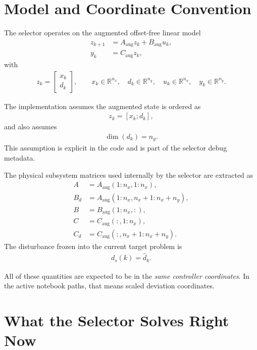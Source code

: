 \documentclass[11pt]{article}
\begin{document}
\section{Model and Coordinate Convention}
The selector operates on the augmented offset-free linear model
\begin{align}
z_{k+1} &= A_{\mathrm{aug}} z_k + B_{\mathrm{aug}} u_k, \\
y_k &= C_{\mathrm{aug}} z_k,
\end{align}
with
\begin{align}
z_k = \begin{bmatrix} x_k \\ d_k \end{bmatrix},
\qquad
x_k \in \mathbb{R}^{n_x},
\quad
d_k \in \mathbb{R}^{n_y},
\quad
u_k \in \mathbb{R}^{n_u},
\quad
y_k \in \mathbb{R}^{n_y}.
\end{align}

The implementation assumes the augmented state is ordered as
\begin{align}
z_k = [x_k;d_k],
\end{align}
and also assumes
\begin{align}
\dim(d_k) = n_y.
\end{align}
This assumption is explicit in the code and is part of the selector debug metadata.

The physical subsystem matrices used internally by the selector are extracted as
\begin{align}
A &= A_{\mathrm{aug}}(1\!:\!n_x,1\!:\!n_x), \\
B_d &= A_{\mathrm{aug}}(1\!:\!n_x,n_x\!+\!1\!:\!n_x\!+\!n_y), \\
B &= B_{\mathrm{aug}}(1\!:\!n_x,:), \\
C &= C_{\mathrm{aug}}(:,1\!:\!n_x), \\
C_d &= C_{\mathrm{aug}}(:,n_x\!+\!1\!:\!n_x\!+\!n_y).
\end{align}
The disturbance frozen into the current target problem is
\begin{align}
d_s(k) = \hat d_k.
\end{align}

All of these quantities are expected to be in the \emph{same controller coordinates}. In the active notebook paths, that means scaled deviation coordinates.

\section{What the Selector Solves Right Now}
\end{document}
